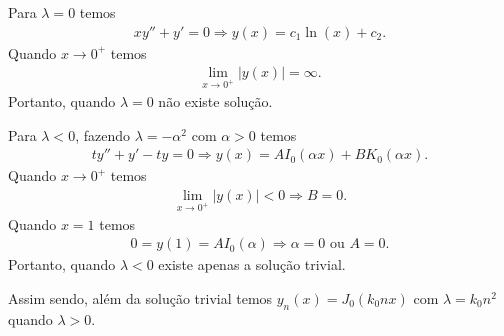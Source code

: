 \documentclass[a4paper,12pt, leqno, answers]{exam}
\begin{document}
\begin{questions}
\begin{parts}
\begin{solution}
            Para $\lambda = 0$ temos
            \begin{align*}
                x y'' + y' = 0 \Rightarrow y(x) = c_1 \ln(x) + c_2.
            \end{align*}
            Quando $x \to 0^+$ temos
            \begin{align*}
                \lim_{x \to 0^+} | y(x) | = \infty.
            \end{align*}
            Portanto, quando $\lambda = 0$ n\~{a}o existe solu\c{c}\~{a}o.

            Para $\lambda < 0$, fazendo $\lambda = - \alpha^2$ com $\alpha > 0$ temos
            \begin{align*}
                t y'' + y' - t y = 0 \Rightarrow y(x) = A I_0(\alpha x) + B K_0(\alpha x).
            \end{align*}
            Quando $x \to 0^+$ temos
            \begin{align*}
                \lim_{x \to 0^+} | y(x) | < 0 \Rightarrow B = 0.
            \end{align*}
            Quando $x = 1$ temos
            \begin{align*}
                0 = y(1) = A I_0(\alpha) \Rightarrow \alpha = 0 \text{ ou } A = 0.
            \end{align*}
            Portanto, quando $\lambda < 0$ existe apenas a solu\c{c}\~{a}o trivial.

            Assim sendo, al\'{e}m da solu\c{c}\~{a}o trivial temos $y_n(x) = J_0(k_0 n x)$ com $\lambda = k_0 n^2$ quando $\lambda > 0$.
        \end{solution}
        

\end{parts}
\end{questions}
\end{document}
